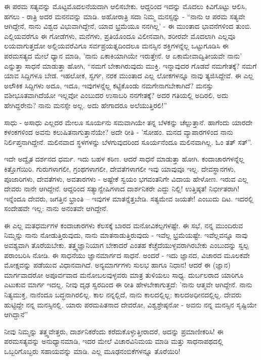 ಈ ಪರಮ ಸತ್ಯವನ್ನು ಮೊಟ್ಟಮೊದಲನೆಯದಾಗಿ ಆಲಿಸಬೇಕು. ಆದ್ದರಿಂದ ಇದನ್ನು ಮೊದಲು ಕಿವಿಗೊಟ್ಟು ಆಲಿಸಿ, ಹಗಲು - ರಾತ್ರಿ ಅದರ ಮನನವನ್ನು ಮಾಡಿ. ಅಹೋರಾತ್ರಿ ಸದಾ ನಿಮ್ಮ ಮನಸ್ಸನ್ನು - “ನಾನು ಆ ಪರಮ ಸತ್ಯವೇ ಆಗಿದ್ದೇನೆ, ನಾನು ವಿಶ್ವದ ವಿಭುವಾಗಿದ್ದೇನೆ, ಯಾವ ಭ್ರಮೆಯೂ ನನಗಿಲ್ಲ' - ಈ ಮುಂತಾದ ಭಾವನೆಗಳಿಂದ ತುಂಬಿ. ಎಲ್ಲಿಯವರೆಗೂ ಈ ಗೋಡೆಗಳು, ಮನೆಗಳು, ಪ್ರತಿಯೊಂದೂ ವಿಲೀನವಾಗಿ, ಶರೀರವೇ ಮೊದಲಾಗಿ ಎಲ್ಲವೂ ಲಯವಾಗುತ್ತದೋ ಅಲ್ಲಿಯವರೆವಿಗೂ ಸರ್ವಪ್ರಯತ್ನದಿಂದಲೂ ಮನಸ್ಸಿನ ಶಕ್ತಿಗಳನ್ನೆಲ್ಲ ಒಟ್ಟುಗೂಡಿಸಿ ಈ ಪರಮಸತ್ಯದ ಮೇಲೆ ಧ್ಯಾನ ಮಾಡಿ, 'ನಾನು ಏಕಾಕಿಯಾಗಿಯೇ ಇರುತ್ತೇನೆ. ಆ ಏಕಾಮೇವಾದ್ವಿತೀಯವೇ ನಾನು' ಎನ್ನುತ್ತಾ ಸಾಧನೆ ಮಾಡುತ್ತಾ ಹೋಗಿ, “ನಮಗೆ ಬೇಕಾಗಿರುವುದು ಮುಕ್ತಿ. ಇನ್ನಾವುದರ ಗೊಡವೆ ನಮಗೇತಕ್ಕೆ? ನಮಗೆ ಯಾವ ಸಿದ್ದಿಗಳೂ ಬೇಡ. ಇಹಲೋಕ, ಸ್ವರ್ಗ, ನರಕ ಮುಂತಾದ ಎಲ್ಲ ಲೋಕಗಳನ್ನೂ ನಾವು ತ್ಯಜಿಸಿದ್ದೇವೆ. ಈ ಎಲ್ಲ ಅಲೌಕಿಕ ಸಿದ್ದಿಗಳು ಅದೂ, ಇದೂ, ಇವುಗಳನ್ನೆಲ್ಲ ಕಟ್ಟಿಕೊಂಡು ನಮಗೇನಾಗಬೇಕಾಗಿದೆ? ಮನಸ್ಸು ವಶೀಭೂತವಾಗಿದೆಯೋ ಇಲ್ಲವೋ ಎಂಬುದರ ಉಸಾಬರಿ ನನಗೇತಕ್ಕೆ? ಅದರ ಗತಿಯಲ್ಲಿ ಅದಿರಲಿ, ಅದು ಹೇಗಿದ್ದರೇನು? ನಾನು ಮನಸ್ಸೇ ಅಲ್ಲ. ಅದು ಹೇಗಾದರೂ ಅಲೆಯುತ್ತಿರಲಿ!”

ಸಾಧು - ಅಸಾಧು ಎಲ್ಲದರ ಮೇಲೂ ಸೂರ್ಯನು ಸಮವಾಗಿಯೇ ತನ್ನ ಬೆಳಕನ್ನು ಚೆಲ್ಲುತ್ತಾನೆ. ಹಾಗೆಂದು ಯಾರದೇ ಕಳಂಕಗಳಿಂದ ಅವನು ಕಲುಷಿತನಾಗುತ್ತಾನೆಯೇ? ಅದೇ ರೀತಿ - 'ಸೋಹಂ. ಮನದ ವ್ಯಾಪಾರಗಳಿಂದ ನಾನು ನಿರ್ಲಿಪ್ತನಾಗಿದ್ದೇನೆ. ಮಲಿನವಾದ ಸ್ಥಳಗಳನ್ನು ಬೆಳಗುವುದರಿಂದ ಸೂರ್ಯನೆಂದೂ ಮಲಿನವಾಗಿಲ್ಲ. ಓಂ ತತ್ ಸತ್”.

ಇದೇ ಅದ್ವೈತ ದರ್ಶನದ ಧರ್ಮ. ಇದು ಬಹಳ ಕಠಿಣ. ಆದರೆ ಸಾಧನೆ ಮಾಡುತ್ತಾ ಹೋಗಿ. ಕಂದಾಚಾರಗಳನ್ನೆಲ್ಲ ಕಿತ್ತೊಗೆಯಿರಿ. ಗುರುಗಳಾಗಲೀ, ಗ್ರಂಥಗಳಾಗಲೀ, ದೇವತೆಗಳಾಗಲೀ ಇವು ಯಾವುವೂ ಇಲ್ಲ. ದೇವಸ್ಥಾನಗಳು, ಪೂಜಾರಿಗಳು, ದೇವತೆಗಳು, ಅವತಾರಗಳು - ಅಷ್ಟೇಕೆ ಸ್ವಯಂ ಭಗವಂತನಿಗೇ ವಿದಾಯ ಹೇಳೋಣ. ಇರುವ ಎಲ್ಲ ದೇವರು ನಾನೇ ಆಗಿದ್ದೇನೆ. ಆದ್ದರಿಂದ ಸತ್ಯಾನ್ವೇಷಿಗಳಾದ ದಾರ್ಶನಿಕರೇ ಎದ್ದು ನಿಲ್ಲಿ! ಉತ್ತಿಷ್ಠತ! ನಿರ್ಭೀತರಾಗಿ! ಇನ್ನೆಂದೂ ದೇವರು, ಜಗತ್ತಿನ ಭ್ರಾಂತಿ – ಇವುಗಳ ಮಾತನ್ನೆತ್ತಬೇಡಿ. ಸತ್ಯಮೇವ ಜಯತೇ! ಎಂಬುದು ದಿಟ. ಇದರಲ್ಲಿ ಸಂದೇಹವೇ ಇಲ್ಲ: ನಾನು ಅನಂತವೇ ಆಗಿದ್ದೇನೆ.

ಈ ಎಲ್ಲ ಮತಧರ್ಮಗಳ ಕಂದಾಚಾರಗಳು ಕೆಲಸಕ್ಕೆ ಬಾರದ ಮನೋವಿಕಲ್ಪಗಳಷ್ಟೇ. ಈ ಸಭೆ, ನನ್ನ ಮುಂದಿರುವ ನಿಮ್ಮನ್ನು ನಾನು ನೋಡುತ್ತಿರುವುದು, ನಾನು ಮಾತನಾಡುತ್ತಿರುವುದು - ಇವೆಲ್ಲ ಭ್ರಮೆಯಷ್ಟೇ. ಇವೆಲ್ಲವನ್ನೂ ನಾವು ಅವಶ್ಯವಾಗಿ ತೊರೆಯಬೇಕು. ತತ್ತ್ವಜ್ಞಾನಿಯಾಗ ಬೇಕಾದರೆ ಎಂತಹ ಕೆಚ್ಚೆದೆಯುಳ್ಳವರಾಗಿರಬೇಕು ಎಂಬುದನ್ನು ಸ್ವಲ್ಪ ಪರಾಂಬರಿಸಿ ನೋಡಿ. ಈ ಸಾಧನೆಯು ಜ್ಞಾನಮಾರ್ಗದ ಸಾಧನೆ. ಅಂದರೆ - ಇದು ಜ್ಞಾನದ, ವಿಚಾರದ ಮೂಲಕವೇ ಮೋಕ್ಷವನ್ನು ಪಡೆಯುವ ವಿಧಾನವಾಗಿದೆ. ಅನ್ಯಮಾರ್ಗಗಳು ಸುಲಭ ಹಾಗೂ ನಿಧಾನ! ಆದರೆ ಈ (ಜ್ಞಾನ) ಮಾರ್ಗವಾದರೋ ಅಪೂರ್ವವಾದ ಮನೋಬಲವುಳ್ಳವರು ಮಾತ್ರ ತುಳಿಯಲು ಸಾಧ್ಯ. ದುರ್ಬಲರಾದ ಯಾರಿಗೂ ಎಟುಕುವ ಮಾರ್ಗ ಇದಲ್ಲ. ನೀವು ದೃಢ ಸ್ವರದಿಂದ ಈ ರೀತಿ ಹೇಳಬೇಕಾಗುತ್ತದೆ: 'ನಾನು ಆತ್ಮವೇ ಆಗಿದ್ದೇನೆ. ನಾನು ನಿತ್ಯಮುಕ್ತ, ನಾನೆಂದೂ ಬದ್ಧನಾಗಿರಲಿಲ್ಲ. ಕಾಲ ನನ್ನಲ್ಲಿದೆ, ನಾನು ಕಾಲದಲ್ಲಿಲ್ಲ; ಕಾಲದ\break ಅಧೀನದಲ್ಲಿಲ್ಲ. ದೇವರು ಹುಟ್ಟಿದ್ದೇ ನನ್ನ ಮನಸ್ಸಿನಲ್ಲಿ. ಯಾರು ಪರಮಪಿತನಾದ ದೇವರೋ, ವಿಶ್ವಶ್ರೇಷ್ಠನೋ - ಅವನು ನನ್ನ ಮನಸ್ಸಿನ ಸೃಷ್ಟಿಯೇ ಆಗಿದ್ದಾನೆ''

ನೀವು ನಿಮ್ಮನ್ನು ತತ್ತ್ವವೇತ್ತರು, ದಾರ್ಶನಿಕರೆಂದು ಕರೆದುಕೊಳ್ಳುತ್ತೀರಾದರೆ, ಅದನ್ನು ಪ್ರಮಾಣೀಕರಿಸಿ! ಈ ಪರಮಸತ್ಯವನ್ನು ಅನುಧ್ಯಾನಮಾಡಿ, ಇದರ ಮೇಲೆ ವಿಚಾರವಿನಿಮಯ ಮಾಡಿ ಮತ್ತು ಸಾಧನಾಪಥದಲ್ಲಿ ಒಬ್ಬರಿಗೊಬ್ಬರು ಸಹಾಯವನ್ನು ಮಾಡಿ. ಎಲ್ಲ ಮೂಢನಂಬಿಕೆಗಳನ್ನೂ ತೊರೆಯಿರಿ!

